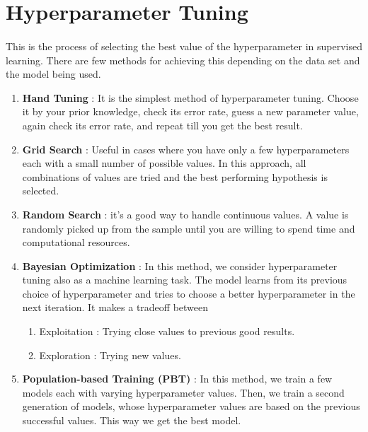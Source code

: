 \documentclass{article}
\begin{document}
\section*{Hyperparameter Tuning}
      \paragraph{}
      This is the process of selecting the best value of the hyperparameter in supervised learning. 
      There are few methods for achieving this depending on the data set and the model being used.
        \begin{enumerate}
          \item \textbf{Hand Tuning} : It is the simplest method of hyperparameter tuning. Choose it by your prior knowledge, check its error rate, guess a new parameter value, again check its error rate, and repeat till you get the best result.
          \item \textbf{Grid Search} : Useful in cases where you have only a few hyperparameters each with a small number of possible values. In this approach, all combinations of values are tried and the best performing hypothesis is selected.
          \item \textbf{Random Search} : it’s a good way to handle continuous values. A value is randomly picked up from the sample until you are willing to spend time and computational resources.
          \item \textbf{Bayesian Optimization} : In this method, we consider hyperparameter tuning also as a machine learning task. The model learns from its previous choice of hyperparameter and tries to choose a better hyperparameter in the next iteration. It makes a tradeoff between
            \begin{enumerate}
              \item Exploitation : Trying close values to previous good results.
              \item Exploration : Trying new values.
            \end{enumerate}
          \item \textbf{Population-based Training (PBT)} : In this method, we train a few models each with varying hyperparameter values. Then, we train a second generation of models, whose hyperparameter values are based on the previous successful values. This way we get the best model.

        \end{enumerate}
    
\end{document}
